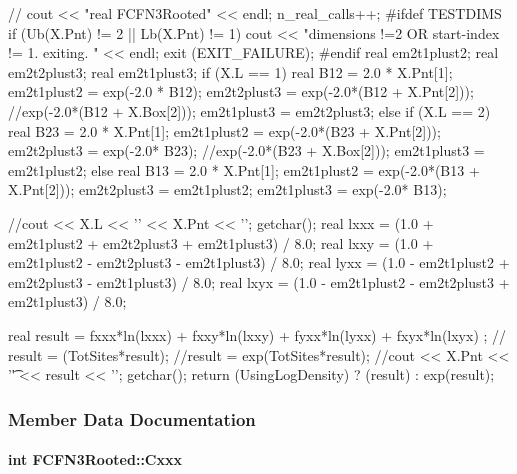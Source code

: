 \begin{DoxyCode}
{
  // cout << "real FCFN3Rooted" << endl;
  n_real_calls++;
  #ifdef TESTDIMS
  if (Ub(X.Pnt) != 2 || Lb(X.Pnt) != 1)
  {
    cout << "dimensions !=2 OR start-index != 1. exiting. " 
    << endl; exit (EXIT_FAILURE);
  }
  #endif
  real em2t1plust2;
  real em2t2plust3;
  real em2t1plust3;
  if (X.L == 1)     
  {
    real B12 = 2.0 * X.Pnt[1];
    em2t1plust2 = exp(-2.0 * B12);
    em2t2plust3 = exp(-2.0*(B12 + X.Pnt[2]));
                    //exp(-2.0*(B12 + X.Box[2]));
    em2t1plust3 = em2t2plust3;
  }
  else if (X.L == 2)
  {
    real B23 = 2.0 * X.Pnt[1];
    em2t1plust2 = exp(-2.0*(B23 + X.Pnt[2]));
    em2t2plust3 = exp(-2.0* B23);
                    //exp(-2.0*(B23 + X.Box[2]));
    em2t1plust3 = em2t1plust2;
  }
  else              
  {
    real B13 = 2.0 * X.Pnt[1];
    em2t1plust2 = exp(-2.0*(B13 + X.Pnt[2]));
    em2t2plust3 = em2t1plust2;
    em2t1plust3 = exp(-2.0* B13);
  }

  //cout << X.L    << '\n' << X.Pnt          << '\n'; getchar();
  real lxxx = (1.0 + em2t1plust2 + em2t2plust3 + em2t1plust3) / 8.0;
  real lxxy = (1.0 + em2t1plust2 - em2t2plust3 - em2t1plust3) / 8.0;
  real lyxx = (1.0 - em2t1plust2 + em2t2plust3 - em2t1plust3) / 8.0;
  real lxyx = (1.0 - em2t1plust2 - em2t2plust3 + em2t1plust3) / 8.0;

  real result = fxxx*ln(lxxx) + fxxy*ln(lxxy) + 
                fyxx*ln(lyxx) + fxyx*ln(lxyx) ;
  // result = (TotSites*result);
  //result = exp(TotSites*result);
  //cout << X.Pnt    << '\t' << result << '\n'; getchar();
  return (UsingLogDensity) ? (result) : exp(result);
}
\end{DoxyCode}


\subsubsection{\-Member \-Data \-Documentation}
\hypertarget{classFCFN3Rooted_aa8d0899c02617f891b449bf4fea77124}{
\paragraph[{\-Cxxx}]{\setlength{\rightskip}{0pt plus 5cm}int {\bf \-F\-C\-F\-N3\-Rooted\-::\-Cxxx}}}\label{classFCFN3Rooted_aa8d0899c02617f891b449bf4fea77124}


